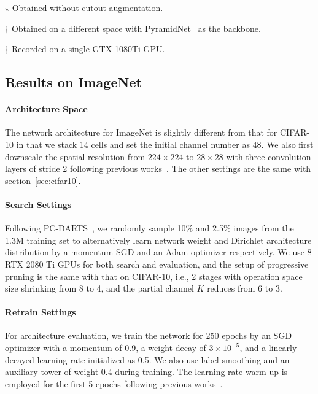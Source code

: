 \documentclass{article} \usepackage{iclr2021_conference,times}
\begin{document}
\begin{table}[!t]
{\begin{threeparttable}
    \begin{tablenotes}
        \item[$\star$] Obtained without cutout augmentation.
        \item[$\dagger$] Obtained on a different space with PyramidNet~\citep{pyramidnet} as the backbone.
        \item[$\ddagger$] Recorded on a single GTX 1080Ti GPU.
\end{tablenotes}
    \end{threeparttable}}
    \label{tab:cifar10}
    \vspace{-2.5mm}
\end{table}


\subsection{Results on ImageNet}
\label{sec:imagenet}
\paragraph{Architecture Space}
The network architecture for ImageNet is slightly different from that for CIFAR-10 in that we stack 14 cells and set the initial channel number as 48. We also first downscale the spatial resolution from $224\times 224$ to $28\times 28$ with three convolution layers of stride 2 following previous works~\citep{pcdarts,pdarts}.
The other settings are the same with section~\ref{sec:cifar10}.

\paragraph{Search Settings}
Following PC-DARTS~\citep{pcdarts}, we randomly sample 10\% and 2.5\% images from the 1.3M training set to alternatively learn network weight and Dirichlet architecture distribution by a momentum SGD and an Adam optimizer respectively.
We use 8 RTX 2080 Ti GPUs for both search and evaluation, and the setup of progressive pruning is the same with that on CIFAR-10, i.e., 2 stages with operation space size shrinking from 8 to 4, and the partial channel $K$ reduces from 6 to 3.

\paragraph{Retrain Settings}
For architecture evaluation, we train the network for 250 epochs by an SGD optimizer with a momentum of 0.9, a weight decay of $3\times 10^{-5}$, and a linearly decayed learning rate initialized as 0.5. 
We also use label smoothing and an auxiliary tower of weight 0.4 during training.
The learning rate warm-up is employed for the first 5 epochs following previous works~\citep{pdarts,pcdarts}.
\end{document}
